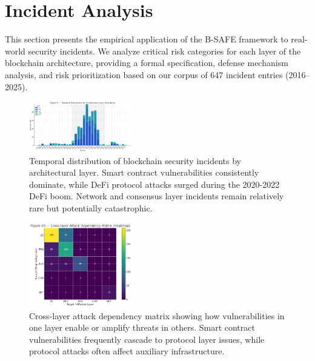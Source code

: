 \section{Incident Analysis}
\label{sec:incident_analysis}

This section presents the empirical application of the B-SAFE framework to real-world security incidents. We analyze critical risk categories for each layer of the blockchain architecture, providing a formal specification, defense mechanism analysis, and risk prioritization based on our corpus of 647 incident entries (2016--2025).

\begin{figure}[H]
\centering
\includegraphics[width=0.4\textwidth]{../figure/fig6.png}
\caption{Temporal distribution of blockchain security incidents by architectural layer. Smart contract vulnerabilities consistently dominate, while DeFi protocol attacks surged during the 2020-2022 DeFi boom. Network and consensus layer incidents remain relatively rare but potentially catastrophic.}
\label{fig:incident_timeline}
\end{figure}

\begin{figure}[H]
\centering
\includegraphics[width=0.4\textwidth]{../figure/fig7.png}
\caption{Cross-layer attack dependency matrix showing how vulnerabilities in one layer enable or amplify threats in others. Smart contract vulnerabilities frequently cascade to protocol layer issues, while protocol attacks often affect auxiliary infrastructure.}
\label{fig:cross_layer_dependencies}
\end{figure}







